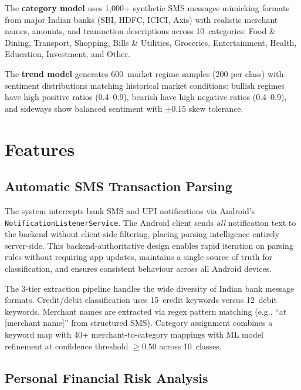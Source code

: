 \documentclass[conference]{IEEEtran}
\begin{document}
The \textbf{category model} uses 1,000+ synthetic SMS messages mimicking formats from major Indian banks (SBI, HDFC, ICICI, Axis) with realistic merchant names, amounts, and transaction descriptions across 10~categories: Food \& Dining, Transport, Shopping, Bills \& Utilities, Groceries, Entertainment, Health, Education, Investment, and Other.

The \textbf{trend model} generates 600~market regime samples (200 per class) with sentiment distributions matching historical market conditions: bullish regimes have high positive ratios (0.4--0.9), bearish have high negative ratios (0.4--0.9), and sideways show balanced sentiment with $\pm 0.15$ skew tolerance.

\section{Features}

\subsection{Automatic SMS Transaction Parsing}

The system intercepts bank SMS and UPI notifications via Android's \texttt{NotificationListenerService}. The Android client sends \emph{all} notification text to the backend without client-side filtering, placing parsing intelligence entirely server-side. This backend-authoritative design enables rapid iteration on parsing rules without requiring app updates, maintains a single source of truth for classification, and ensures consistent behaviour across all Android devices.

The 3-tier extraction pipeline handles the wide diversity of Indian bank message formats. Credit/debit classification uses 15~credit keywords versus 12~debit keywords. Merchant names are extracted via regex pattern matching (e.g., ``at [merchant name]'' from structured SMS). Category assignment combines a keyword map with 40+ merchant-to-category mappings with ML model refinement at confidence threshold $\geq 0.50$ across 10~classes.

\subsection{Personal Financial Risk Analysis}
\end{document}
